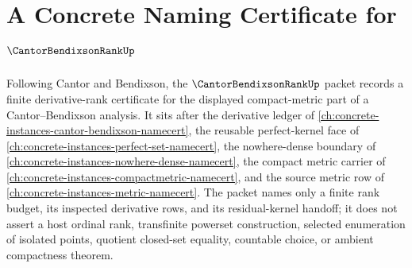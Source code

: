 \chapter{A Concrete Naming Certificate for $\CantorBendixsonRankUp$}
\label{ch:concrete-instances-cantor-bendixson-rank-namecert}

Following Cantor and Bendixson, the $\CantorBendixsonRankUp$ packet records a finite derivative-rank certificate for the displayed compact-metric part of a Cantor--Bendixson analysis. It sits after the derivative ledger of \autoref{ch:concrete-instances-cantor-bendixson-namecert}, the reusable perfect-kernel face of \autoref{ch:concrete-instances-perfect-set-namecert}, the nowhere-dense boundary of \autoref{ch:concrete-instances-nowhere-dense-namecert}, the compact metric carrier of \autoref{ch:concrete-instances-compactmetric-namecert}, and the source metric row of \autoref{ch:concrete-instances-metric-namecert}. The packet names only a finite rank budget, its inspected derivative rows, and its residual-kernel handoff; it does not assert a host ordinal rank, transfinite powerset construction, selected enumeration of isolated points, quotient closed-set equality, countable choice, or ambient compactness theorem.

